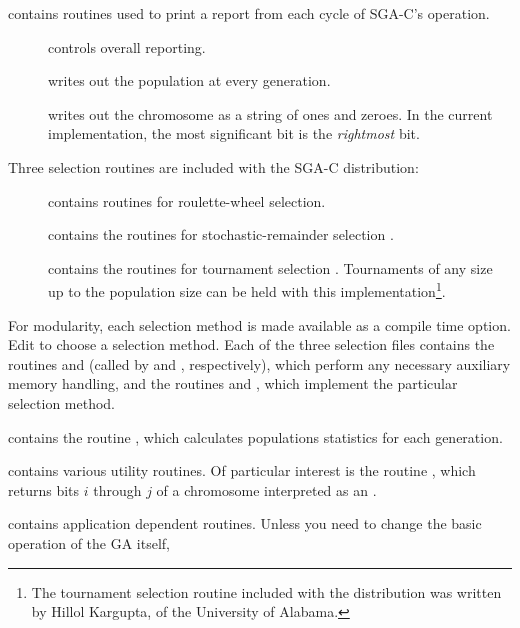 \begin{description}
\begin{description}
\end{description}
\item[{\btt{report.c}}] contains routines used to print a report from each cycle of SGA-C's operation.
\begin{description}
\item[{}] controls overall reporting.
\item[{}] writes out the population at every generation.
\item[{}] writes out the chromosome as a string of ones and zeroes.
In the current implementation, the most significant bit is the {\it rightmost} bit.
\end{description}
\item Three selection routines are included with the SGA-C distribution:
\begin{description}
\item[{}] contains routines for roulette-wheel selection.  
\item[{}] contains the routines for stochastic-remainder selection 
\cite{Booker:82}.
\item[{}] contains the routines for tournament selection 
\cite{Brindle:81a}.  Tournaments of any size up to the population size can be held
with this implementation\footnote{The tournament selection routine
included with the distribution was written by Hillol Kargupta, of the University
of Alabama.}.
\end{description}
For modularity, each selection method 
is made available as a compile time option.
Edit {} to choose a selection method. Each of the three
selection files 
contains the routines
{} and {} (called by {} and {}, respectively), which perform
any necessary auxiliary memory handling,
and the routines {} and {}, 
which implement the particular selection method.
\item[{\btt{stats.c}}] contains the routine {}, which calculates 
populations statistics for each generation.
\item[{\btt{utility.c}}] contains various utility routines. Of particular interest 
is the routine {}, which returns bits $i$ through $j$ of a 
chromosome interpreted as an {}. 
\item[{\btt{app.c}}] contains application dependent routines. 
Unless you need to change the basic operation of the GA itself, 

\end{description}
